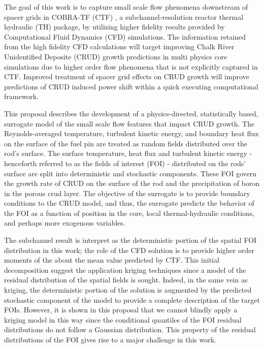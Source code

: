 The goal of this work is to capture small scale flow phenomena downstream of
spacer grids in COBRA-TF (CTF) \cite{salko12}, a subchannel-resolution reactor
thermal hydraulic (TH) package, by utilizing higher fidelity results provided
by Computational Fluid Dynamics (CFD) simulations.  The information retained from the high
fidelity CFD calculations will target improving Chalk River Unidentified Deposite (CRUD) growth predictions in
multi physics core simulations due to higher order flow phenomena that is not
explicitly captured in CTF.  
Improved treatment of spacer grid
effects on CRUD growth will improve predictions of CRUD induced power shift
within a quick executing computational framework.

This proposal describes the development of a physics-directed, statistically
based, surrogate model of the small scale flow features that impact CRUD
growth.  The Reynolds-averaged temperature, turbulent kinetic energy, and
boundary heat flux on the surface of the fuel pin are treated as random
fields distributed over the rod's surface.  The surface temperature, heat flux and
turbulent kinetic energy - henceforth referred to as the fields of interest
(FOI) - distributed on the rods' surface are split into deterministic and
stochastic components.  These FOI govern the growth rate of CRUD on the surface
of the rod and the precipitation of boron in the porous crud layer.
The objective of the surrogate is to provide boundary conditions to the CRUD
model, and thus, the surrogate predicts the behavior of the FOI as a function
of position in the core, local thermal-hydraulic conditions, and perhaps 
more exogenous variables.

The subchannel result is interpret as the deterministic portion of the spatial
FOI distribution in this work; the role of the CFD solution is to provide
higher order moments of the about the mean value predicted by CTF.  This initial
decomposition suggest the application kriging techniques since a model of the
residual distribution of the spatial fields is sought.  Indeed, in the same
vein as kriging, the deterministic portion of the solution is augmented by the
predicted stochastic component of the model to provide a complete description of
the target FOIs.  However, it is shown in this proposal that we cannot blindly
apply a kriging model in this way since the conditional quantiles of the FOI
residual distributions do not follow a Gaussian distribution.  This property of
the residual distributions of the FOI gives rise to a major challenge in this
work.

